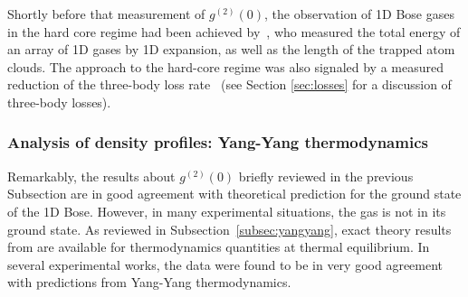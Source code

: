 \documentclass[onecolumn,amsfonts,showpacs,superscriptaddress]{revtex4-1}
\begin{document}
Shortly before that measurement of $g^{(2)}(0)$, the observation of 1D Bose gases in the hard core regime had been achieved  by~\cite{kinoshita_observation_2004}, who measured the total energy of an array of 1D gases by 1D expansion, as well as the length of the trapped atom clouds. The approach to the hard-core regime was also signaled by a measured reduction of the  three-body loss rate~\citep{tolra_observation_2004} (see Section \ref{sec:losses} for a discussion of three-body losses).



\subsubsection{Analysis of density profiles: Yang-Yang thermodynamics}
\label{subsec:analysisnx}
Remarkably, the results about $g^{(2)}(0)$ briefly reviewed in the previous Subsection are in good agreement
with theoretical prediction for the ground state of the 1D Bose. However, in many experimental situations, the gas is not in its ground state.
As reviewed in Subsection~\ref{subsec:yangyang}, exact theory results from \cite{yang1969thermodynamics} are available for thermodynamics quantities at thermal equilibrium.  
In several experimental works, the data were found to be in very good agreement with predictions from Yang-Yang thermodynamics.
\end{document}
